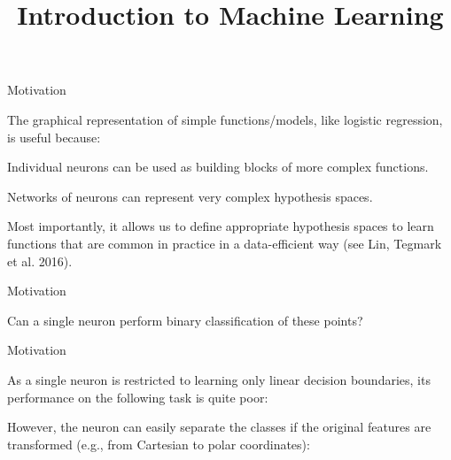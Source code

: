 \documentclass[11pt,compress,t,notes=noshow, xcolor=table]{beamer}
\title{Introduction to Machine Learning}
\begin{document}



\begin{framei}{Motivation}
\item The graphical representation of simple functions/models, like logistic regression, is useful because:
\item Individual neurons can be used as building blocks of more complex functions.
\item Networks of neurons can represent very complex hypothesis spaces.
\item Most importantly, it allows us to define appropriate hypothesis spaces to learn functions that are 
common in practice in a data-efficient way (see Lin, Tegmark et al. 2016).
\end{framei}


\begin{framei}{Motivation}
\item Can a single neuron perform binary classification of these points?
\end{framei}


\begin{framei}{Motivation}
\item As a single neuron is restricted to learning only linear decision boundaries, its performance on the following task is quite poor:
\item However, the neuron can easily separate the classes if the original features are transformed (e.g., from Cartesian to polar coordinates): 
\end{framei}
\end{document}

